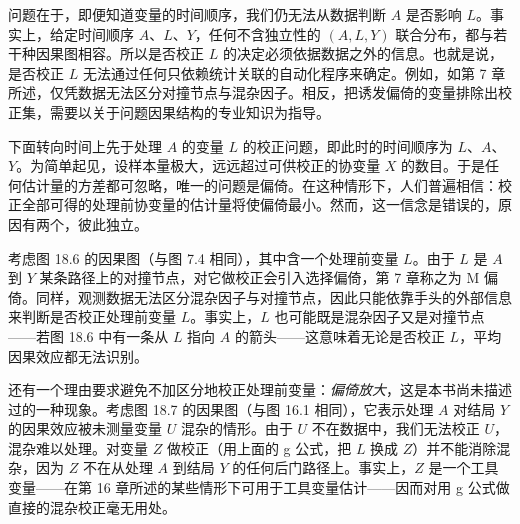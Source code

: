 \begin{figure}[htbp]
\centering
{}
\caption{}
\label{fig:18.5}
\end{figure}

问题在于，即便知道变量的时间顺序，我们仍无法从数据判断 $A$ 是否影响 $L$。事实上，给定时间顺序 $A$、$L$、$Y$，任何不含独立性的 $(A,L,Y)$ 联合分布，都与若干种因果图相容。所以是否校正 $L$ 的决定必须依据数据之外的信息。也就是说，是否校正 $L$ 无法通过任何只依赖统计关联的自动化程序来确定。例如，如第 7 章所述，仅凭数据无法区分对撞节点与混杂因子。相反，把诱发偏倚的变量排除出校正集，需要以关于问题因果结构的专业知识为指导。

下面转向时间上先于处理 $A$ 的变量 $L$ 的校正问题，即此时的时间顺序为 $L$、$A$、$Y$。为简单起见，设样本量极大，远远超过可供校正的协变量 $X$ 的数目。于是任何估计量的方差都可忽略，唯一的问题是偏倚。在这种情形下，人们普遍相信：校正全部可得的处理前协变量的估计量将使偏倚最小。然而，这一信念是错误的，原因有两个，彼此独立。

考虑图 18.6 的因果图（与图 7.4 相同），其中含一个处理前变量 $L$。由于 $L$ 是 $A$ 到 $Y$ 某条路径上的对撞节点，对它做校正会引入选择偏倚，第 7 章称之为 M 偏倚。同样，观测数据无法区分混杂因子与对撞节点，因此只能依靠手头的外部信息来判断是否校正处理前变量 $L$。事实上，$L$ 也可能既是混杂因子又是对撞节点——若图 18.6 中有一条从 $L$ 指向 $A$ 的箭头——这意味着无论是否校正 $L$，平均因果效应都无法识别。

\begin{figure}[htbp]
\centering
{}
\caption{}
\label{fig:18.6}
\end{figure}

还有一个理由要求避免不加区分地校正处理前变量：\emph{偏倚放大}，这是本书尚未描述过的一种现象。考虑图 18.7 的因果图（与图 16.1 相同），它表示处理 $A$ 对结局 $Y$ 的因果效应被未测量变量 $U$ 混杂的情形。由于 $U$ 不在数据中，我们无法校正 $U$，混杂难以处理。对变量 $Z$ 做校正（用上面的 g 公式，把 $L$ 换成 $Z$）并不能消除混杂，因为 $Z$ 不在从处理 $A$ 到结局 $Y$ 的任何后门路径上。事实上，$Z$ 是一个工具变量——在第 16 章所述的某些情形下可用于工具变量估计——因而对用 g 公式做直接的混杂校正毫无用处。

